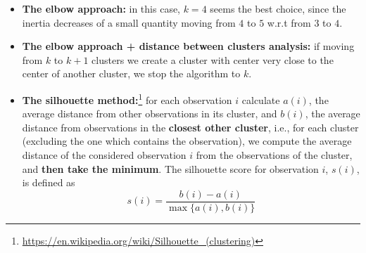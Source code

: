 \begin{itemize}
    \item \textbf{The elbow approach:} in this case, $k=4$ seems the best choice, since the inertia decreases of a small quantity moving from $4$ to $5$ w.r.t from $3$ to $4$.
    \item \textbf{The elbow approach + distance between clusters analysis:} if moving from $k$ to $k+1$ clusters we create a cluster with center very close to the center of another cluster, we stop the algorithm to $k$.
    \item \textbf{The silhouette method:}\footnote{\url{https://en.wikipedia.org/wiki/Silhouette_(clustering)}} for each observation $i$ calculate $a(i)$, the average distance from other observations in its cluster, and $b(i)$, the average distance from observations in the \textbf{closest other cluster}, i.e., for each cluster (excluding the one which contains the observation), we compute the average distance of the considered observation $i$ from the observations of the cluster, and \textbf{then take the minimum}. The silhouette score for observation $i$, $s(i)$, is defined as
          \begin{equation*}
              s(i) =\frac{b(i) -a(i)}{\max\{a(i),b(i)\}}
          \end{equation*}
          

\end{itemize}
